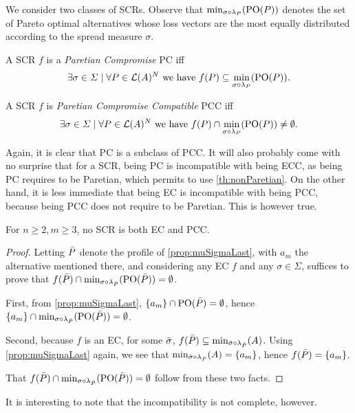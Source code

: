 \documentclass[version=3.21, pagesize, twoside=off, bibliography=totoc, DIV=calc, fontsize=12pt, a4paper]{scrartcl}
\begin{document}
We consider two classes of \acp{SCR}. 
Observe that $\mustar$ denotes the set of Pareto optimal alternatives whose loss vectors are the most equally distributed according to the spread measure $\sigma$.

\begin{definition} A \ac{SCR} $f$ is a \emph{Paretian Compromise} PC iff \[\exists \sigma \in \Sigma \suchthat \forall P \in \linors^N \text{ we have } f(P) \subseteq \mustar.\]
\end{definition}

\begin{definition} A \ac{SCR} $f$ is \emph{Paretian Compromise Compatible} PCC iff \[\exists \sigma \in \Sigma \suchthat \forall P \in \linors^N \text{ we have } f(P) \cap \mustar \neq \emptyset.\]
\end{definition}

Again, it is clear that PC is a subclass of PCC. It will also probably come with no surprise that for a \ac{SCR}, being PC is incompatible with being ECC, as being PC requires to be Paretian, which permits to use \cref{th:nonParetian}. On the other hand, it is less immediate that being EC is incompatible with
being PCC, because being PCC does not require to be Paretian. This is however true.

\begin{theorem} \label{th:incompatibility} 
	For $n ≥ 2, m ≥ 3$, no \ac{SCR} is both EC and PCC.
\end{theorem}
\begin{proof}	
	Letting $\bar{P}$ denote the profile of \cref{prop:muSigmaLast}, with $a_m$ the alternative mentioned there, and considering any EC $f$ and any $\sigma \in \Sigma$, suffices to prove that $f(\Ptop) \cap {\mustar[\sigma][\Ptop]} = \emptyset$.
	
	First, from \cref{prop:muSigmaLast}, $\{a_m\} \cap \text{PO}(\bar{P}) = \emptyset$, hence $\set{a_m} \cap {\mustar[\sigma][\Ptop]} = \emptyset$. 
	
	Second, because $f$ is an EC, for some $\bar{\sigma}$, $f(\Ptop) \subseteq {\musigma[\sigmatop][\Ptop]}$. Using \cref{prop:muSigmaLast} again, we see that ${\musigma[\sigmatop][\Ptop]} = \set{a_m}$, hence $f(\bar{P}) = \{a_m\}$.
	
	That $f(\Ptop) \cap {\mustar[\sigma][\Ptop]} = \emptyset$ follow from these two facts.
\end{proof}

It is interesting to note that the incompatibility is not complete, however.
\end{document}

